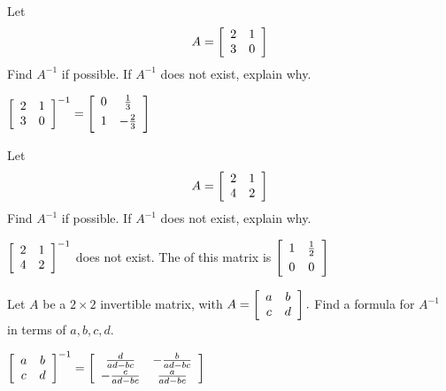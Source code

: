 \begin{enumialphparenastyle}
\begin{ex}Let
\begin{equation*}
A=\left[
\begin{array}{rr}
2 & 1 \\
3 & 0
\end{array}
\right] 
\end{equation*}
Find $A^{-1}$ if possible. If $A^{-1}$ does not exist, explain why.
\begin{sol}
$\leftB
\begin{array}{cc}
2 & 1 \\
3 & 0
\end{array}
\rightB^{-1}= \leftB
\begin{array}{cc}
0 & \vspace{0.05in}\frac{1}{3} \\
1 & -\vspace{0.05in}\frac{2}{3}
\end{array}
\rightB$
\end{sol}
\end{ex}

\begin{ex}Let
\begin{equation*}
A=\left[
\begin{array}{rr}
2 & 1 \\
4 & 2
\end{array}
\right] 
\end{equation*}
Find $A^{-1}$ if possible. If $A^{-1}$ does not exist, explain why. 
\begin{sol}
$\left[
\begin{array}{cc}
2 & 1 \\
4 & 2
\end{array}
\right]^{-1}$ does not exist. The {\rref} of this matrix
is $\leftB
\begin{array}{cc}
1 & \vspace{0.05in}\frac{1}{2} \\
0 & 0
\end{array}
\rightB$
\end{sol}
\end{ex}

\begin{ex}Let $A$ be a $2\times 2$ invertible matrix, with $A=\left[
\begin{array}{cc}
a & b \\
c & d
\end{array}
\right] .$ Find a formula for $A^{-1}$ in terms of $a,b,c,d$.
\begin{sol}
$\left[
\begin{array}{cc}
a & b \\
c & d
\end{array}
\right]^{-1}= \left[
\begin{array}{cc}
\frac{d}{ad-bc} & -\frac{b}{ad-bc} \\
-\frac{c}{ad-bc} & \frac{a}{ad-bc}
\end{array}
\right]$
\end{sol}
\end{ex}


\end{enumialphparenastyle}
